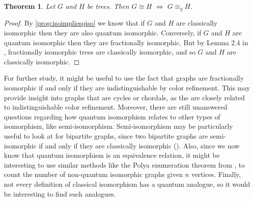 \documentclass[12pt]{article}
\newtheorem{thm}{Theorem}[section]
\begin{document}
\begin{thm}
  \label{Trees}
  Let $G$ and $H$ be trees. Then $G \cong H$ $\Leftrightarrow$ $G
  \cong_q H$.
\end{thm}

\begin{proof}
By \cref{prop:isoimpliesqiso} we know that if $G$ and $H$ are
classically isomorphic then they are also quantum
isomorphic. Conversely, if $G$ and $H$ are quantum isomorphic then
they are fractionally isomorphic. But by Lemma 2.4 in
\cite{rsu1994}, fractionally isomorphic trees are classically
isomorphic, and so $G$ and $H$ are classically isomorphic.
\end{proof}

For further study, it might be useful to use the fact that graphs are
fractionally isomorphic if and only if they are indistinguishable by
color refinement. This may provide insight into graphs that are cycles
or chordals, as the are closely related to indistinguishable color
refinement. Moreover, there are still unanswered questions regarding
how quantum isomorphism relates to other types of isomorphism, like
semi-isomorphism. Semi-isomorphism may be particularly useful to look
at for bipartite graphs, since two bipartite graphs are
semi-isomorphic if and only if they are classically isomorphic
(\cite{rsu1994}).  Also, since we now know that quantum isomorphism
is an equivalence relation, it might be interesting to use similar
methods like the Polya enumeration theorem from \cite{b2009}, to count
the number of non-quantum isomorphic graphs given $n$
vertices. Finally, not every definition of classical isomorphism has a
quantum analogue, so it would be interesting to find such analogues.



\end{document}
